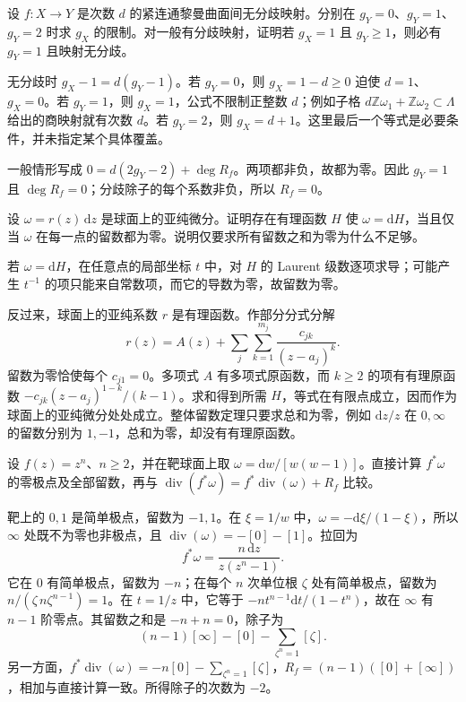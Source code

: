 \begin{exercise}
	\label{g4:ex:0201:unramified-genera}
	设 \(f:X\to Y\) 是次数 \(d\) 的紧连通黎曼曲面间无分歧映射。分别在 \(g_Y=0\)、\(g_Y=1\)、\(g_Y=2\) 时求 \(g_X\) 的限制。对一般有分歧映射，证明若 \(g_X=1\) 且 \(g_Y\geq1\)，则必有 \(g_Y=1\) 且映射无分歧。
\end{exercise}
\begin{solution}
	无分歧时 \(g_X-1=d(g_Y-1)\)。若 \(g_Y=0\)，则 \(g_X=1-d\geq0\) 迫使 \(d=1\)、\(g_X=0\)。若 \(g_Y=1\)，则 \(g_X=1\)，公式不限制正整数 \(d\)；例如子格 \(d\mathbb Z\omega_1+\mathbb Z\omega_2\subset\Lambda\) 给出的商映射就有次数 \(d\)。若 \(g_Y=2\)，则 \(g_X=d+1\)。这里最后一个等式是必要条件，并未指定某个具体覆盖。

	一般情形写成 \(0=d(2g_Y-2)+\deg R_f\)。两项都非负，故都为零。因此 \(g_Y=1\) 且 \(\deg R_f=0\)；分歧除子的每个系数非负，所以 \(R_f=0\)。
\end{solution}

\begin{exercise}
	\label{g4:ex:0201:rational-primitive}
	设 \(\omega=r(z)\,\mathrm{d}z\) 是球面上的亚纯微分。证明存在有理函数 \(H\) 使 \(\omega=\mathrm{d}H\)，当且仅当 \(\omega\) 在每一点的留数都为零。说明仅要求所有留数之和为零为什么不足够。
\end{exercise}
\begin{solution}
	若 \(\omega=\mathrm{d}H\)，在任意点的局部坐标 \(t\) 中，对 \(H\) 的 Laurent 级数逐项求导；可能产生 \(t^{-1}\) 的项只能来自常数项，而它的导数为零，故留数为零。

	反过来，球面上的亚纯系数 \(r\) 是有理函数。作部分分式分解
	\[
		r(z)=A(z)+\sum_j\sum_{k=1}^{m_j}\frac{c_{jk}}{(z-a_j)^k}.
	\]
	留数为零恰使每个 \(c_{j1}=0\)。多项式 \(A\) 有多项式原函数，而 \(k\geq2\) 的项有有理原函数 \(-c_{jk}(z-a_j)^{1-k}/(k-1)\)。求和得到所需 \(H\)，等式在有限点成立，因而作为球面上的亚纯微分处处成立。整体留数定理只要求总和为零，例如 \(\mathrm{d}z/z\) 在 \(0,\infty\) 的留数分别为 \(1,-1\)，总和为零，却没有有理原函数。
\end{solution}

\begin{exercise}
	\label{g4:ex:0201:pullback-divisor}
	设 \(f(z)=z^n\)、\(n\geq2\)，并在靶球面上取 \(\omega=\mathrm{d}w/[w(w-1)]\)。直接计算 \(f^*\omega\) 的零极点及全部留数，再与 \(\operatorname{div}(f^*\omega)=f^*\operatorname{div}(\omega)+R_f\) 比较。
\end{exercise}
\begin{solution}
	靶上的 \(0,1\) 是简单极点，留数为 \(-1,1\)。在 \(\xi=1/w\) 中，\(\omega=-\mathrm{d}\xi/(1-\xi)\)，所以 \(\infty\) 处既不为零也非极点，且 \(\operatorname{div}(\omega)=-[0]-[1]\)。拉回为
	\[
		f^*\omega=\frac{n\,\mathrm{d}z}{z(z^n-1)}.
	\]
	它在 \(0\) 有简单极点，留数为 \(-n\)；在每个 \(n\) 次单位根 \(\zeta\) 处有简单极点，留数为 \(n/(\zeta\,n\zeta^{n-1})=1\)。在 \(t=1/z\) 中，它等于 \(-n t^{n-1}\mathrm{d}t/(1-t^n)\)，故在 \(\infty\) 有 \(n-1\) 阶零点。其留数之和是 \(-n+n=0\)，除子为
	\[
		(n-1)[\infty]-[0]-\sum_{\zeta^n=1}[\zeta].
	\]
	另一方面，\(f^*\operatorname{div}(\omega)=-n[0]-\sum_{\zeta^n=1}[\zeta]\)，\(R_f=(n-1)([0]+[\infty])\)，相加与直接计算一致。所得除子的次数为 \(-2\)。
\end{solution}

